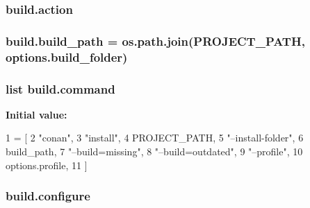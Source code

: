 \subsubsection[{\texorpdfstring{action}{action}}]{\setlength{\rightskip}{0pt plus 5cm}build.\+action}\hypertarget{namespacebuild_add8b407ca543b7e3ec5ed93bc524b251}{}\label{namespacebuild_add8b407ca543b7e3ec5ed93bc524b251}
\subsubsection[{\texorpdfstring{build\+\_\+path}{build_path}}]{\setlength{\rightskip}{0pt plus 5cm}build.\+build\+\_\+path = os.\+path.\+join({\bf P\+R\+O\+J\+E\+C\+T\+\_\+\+P\+A\+TH}, options.\+build\+\_\+folder)}\hypertarget{namespacebuild_a4771056e413a68ffa01e4a3549c8981c}{}\label{namespacebuild_a4771056e413a68ffa01e4a3549c8981c}
\subsubsection[{\texorpdfstring{command}{command}}]{\setlength{\rightskip}{0pt plus 5cm}list build.\+command}\hypertarget{namespacebuild_a42744145588bf3382aa3134b464d378e}{}\label{namespacebuild_a42744145588bf3382aa3134b464d378e}
{\bfseries Initial value\+:}
\begin{DoxyCode}
1 = [
2             \textcolor{stringliteral}{"conan"},
3             \textcolor{stringliteral}{"install"},
4             PROJECT\_PATH,
5             \textcolor{stringliteral}{"--install-folder"},
6             build\_path,
7             \textcolor{stringliteral}{"--build=missing"},
8             \textcolor{stringliteral}{"--build=outdated"},
9             \textcolor{stringliteral}{"--profile"},
10             options.profile,
11         ]
\end{DoxyCode}
\subsubsection[{\texorpdfstring{configure}{configure}}]{\setlength{\rightskip}{0pt plus 5cm}build.\+configure}\hypertarget{namespacebuild_a52581685896d73a5704b29c690a87283}{}\label{namespacebuild_a52581685896d73a5704b29c690a87283}
